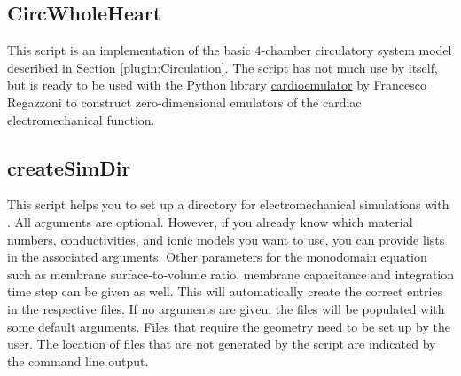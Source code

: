 \subsection{CircWholeHeart}
\label{tools:CircWholeHeart}

This script is an implementation of the basic 4-chamber circulatory system model described in Section \ref{plugin:Circulation}.
The script has not much use by itself, but is ready to be used with the Python library \href{https://github.com/FrancescoRegazzoni/cardioemulator}{cardioemulator} by Francesco Regazzoni to construct zero-dimensional emulators of the cardiac electromechanical function.

\subsection{createSimDir}
\label{tools:createSimDir}

This script helps you to set up a directory for electromechanical simulations with \CM.
All arguments are optional.
However, if you already know which material numbers, conductivities, and ionic models you want to use, you can provide lists in the associated arguments.
Other parameters for the monodomain equation such as membrane surface-to-volume ratio, membrane capacitance and integration time step can be given as well.
This will automatically create the correct entries in the respective files.
If no arguments are given, the files will be populated with some default arguments.
Files that require the geometry need to be set up by the user.
The location of files that are not generated by the script are indicated by the command line output.

